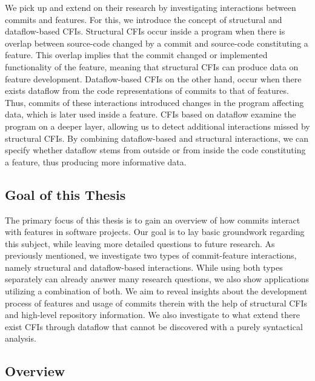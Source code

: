 We pick up and extend on their research by investigating interactions between commits and features.
For this, we introduce the concept of structural and dataflow-based CFIs.
Structural CFIs occur inside a program when there is overlap between source-code changed by a commit and source-code constituting a feature.
This overlap implies that the commit changed or implemented functionality of the feature, meaning that structural CFIs can produce data on feature development.
Dataflow-based CFIs on the other hand, occur when there exists dataflow from the code representations of commits to that of features.
Thus, commits of these interactions introduced changes in the program affecting data, which is later used inside a feature.
CFIs based on dataflow examine the program on a deeper layer, allowing us to detect additional interactions missed by structural CFIs.
By combining dataflow-based and structural interactions, we can specify whether dataflow stems from outside or from inside the code constituting a feature, thus producing more informative data.

\subsection{Goal of this Thesis}\label{sec:thesis_goal}

The primary focus of this thesis is to gain an overview of how commits interact with features in software projects. 
Our goal is to lay basic groundwork regarding this
subject, while leaving more detailed questions to future research. As previously mentioned,
we investigate two types of commit-feature interactions, namely structural and dataflow-based interactions. While
using both types separately can already answer many research questions, we also show
applications utilizing a combination of both.
We aim to reveal insights about the development process of features and usage of commits therein 
with the help of structural CFIs and high-level repository information.
We also investigate to what extend there exist CFIs
through dataflow that cannot be discovered with a purely syntactical analysis.

\subsection{Overview}\label{sec:overview}

